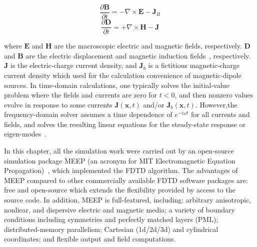 \begin{equation}
  \frac{\partial\bm{B}}{\partial{t}} = - \nabla \times \bm{E} - \bm{J}_B
\end{equation}
\begin{equation}
  \frac{\partial\bm{D}}{\partial{t}} = + \nabla \times \bm{H} - \bm{J}
\end{equation}

where $\bm{E}$ and $\bm{H}$ are the macroscopic electric and magnetic fields,
respectively. $\bm{D}$ and $\bm{B}$ are the electric displacement and magnetic
induction fields~\cite{jackson1999classical}, respectively. $\bm{J}$ is the
electric-charge current density, and $\bm{J}_b$ is a fictitious magnetic-charge
current density which used for the calculation convenience of magnetic-dipole
sources. In time-domain calculations, one typically solves the initial-value
problem where the fields and currents are zero for $t < 0$, and then nonzero
values evolve in response to some currents $\bm{J}(\bm{x},t)$ and/or
$\bm{J}_b(\bm{x},t)$. However,the frequency-domain solver assumes a time
dependence of $e^{-i\omega{t}}$ for all currents and fields, and solves the
resulting linear equations for the steady-state response or
eigen-modes~\cite{joannopoulos2011photonic}.

In this chapter, all the simulation work were carried out by an open-source
simulation package MEEP (an acronym for MIT Electromagnetic Equation
Propagation)~\cite{Oskooi:2010fb}, which implemented the FDTD algorithm. The
advantages of MEEP compared to other commercially available FDTD software
packages are: free and open-source which extends the flexibility provided by
access to the source code. In addition, MEEP is full-featured, including:
arbitrary anisotropic, nonliear, and dispersive electric and magnetic media; a
variety of boundary conditions including symmetries and perfectly matched
layers (PML); distributed-memory parallelism; Cartesian (1d/2d/3d) and
cylindrical coordinates; and flexible output and field computations.

